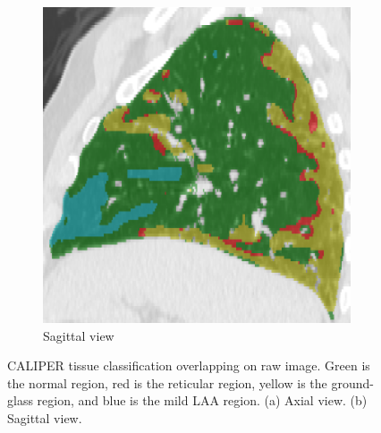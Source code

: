 \begin{figure}[htbp]
\begin{subfigure}{.33\linewidth}
  \includegraphics[width=\linewidth,trim={{.0\wd0} {.0\wd0} {.0\wd0} {.0\wd0}},clip]{QuantitativeAnalysis/Image/IPF305_RegionLabel_Sagittal.png}
  \caption{Sagittal view}
  \label{fig:CALIPERTissueClassification-b}
\end{subfigure}
\caption{ CALIPER tissue classification overlapping on raw image. Green is the normal region, red is the reticular region, yellow is the ground-glass region, and blue is the mild LAA region. (a) Axial view. (b) Sagittal view.}
\label{fig:CALIPERTissueClassification}
\end{figure}

